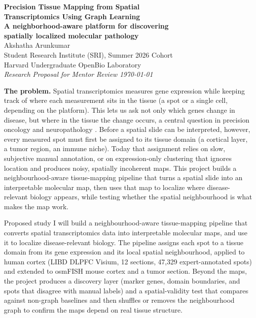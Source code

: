 \documentclass[11pt]{article}
\begin{document}
\begin{center}
  {\LARGE\bfseries\color{sriblue} Precision Tissue Mapping from Spatial\\ Transcriptomics Using Graph Learning}\\[4pt]
  {\large\bfseries\color{sriblue!80!black} A neighborhood-aware platform for discovering\\ spatially localized molecular pathology}\\[10pt]
  {\large Akshatha Arunkumar}\\[2pt]
  {\small Student Research Institute (SRI), Summer 2026 Cohort \\
  Harvard Undergraduate OpenBio Laboratory}\\[2pt]
  {\small\itshape Research Proposal for Mentor Review \quad\textbar\quad \today}
\end{center}

\vspace{2pt}
\begin{problembox}
\textbf{The problem.} Spatial transcriptomics measures gene expression while
keeping track of where each measurement sits in the tissue (a spot or a single
cell, depending on the platform). This lets us ask not only which genes change in
disease, but where in the tissue the change occurs, a central question in
precision oncology and neuropathology \cite{cilento2024}. Before a spatial slide
can be interpreted, however, every measured spot must first be assigned to its
tissue domain (a cortical layer, a tumor region, an immune niche). Today that
assignment relies on slow, subjective manual annotation, or on expression-only
clustering that ignores location and produces noisy, spatially incoherent maps.
This project builds a neighbourhood-aware tissue-mapping pipeline that turns a
spatial slide into an interpretable molecular map, then uses that map to localize
where disease-relevant biology appears, while testing whether the spatial
neighbourhood is what makes the map work.
\end{problembox}

\begin{aimbox}{Proposed study}
I will build a neighbourhood-aware tissue-mapping pipeline that converts spatial
transcriptomics data into interpretable molecular maps, and use it to localize
disease-relevant biology. The pipeline assigns each spot to a tissue domain from
its gene expression and its local spatial neighbourhood, applied to human cortex
(LIBD DLPFC Visium, 12 sections, 47{,}329 expert-annotated spots) and extended to
osmFISH mouse cortex and a tumor section. Beyond the maps, the project produces a
discovery layer (marker genes, domain boundaries, and spots that disagree with
manual labels) and a spatial-validity test that compares against non-graph
baselines and then shuffles or removes the neighbourhood graph to confirm the
maps depend on real tissue structure.
\end{aimbox}
\end{document}
